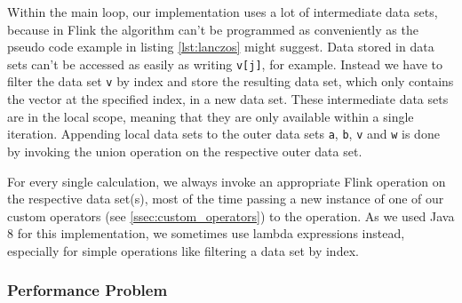 Within the main loop, our implementation uses a lot of intermediate data sets,
because in Flink the algorithm can't be programmed as conveniently as the
pseudo code example in listing \ref{lst:lanczos} might suggest. Data stored in
data sets can't be accessed as easily as writing \texttt{v[j]}, for example.
Instead we have to filter the data set \texttt{v} by index and store the
resulting data set, which only contains the vector at the specified index, in a
new data set. These intermediate data sets are in the local scope, meaning that
they are only available within a single iteration. Appending local data sets to
the outer data sets \texttt{a}, \texttt{b}, \texttt{v} and \texttt{w} is done
by invoking the union operation on the respective outer data set.

For every single calculation, we always invoke an appropriate Flink operation
on the respective data set(s), most of the time passing a new instance of one
of our custom operators (see \ref{ssec:custom_operators}) to the operation. As
we used Java 8 for this implementation, we sometimes use lambda expressions
instead, especially for simple operations like filtering a data set by index.

\subsubsection{Performance Problem}




